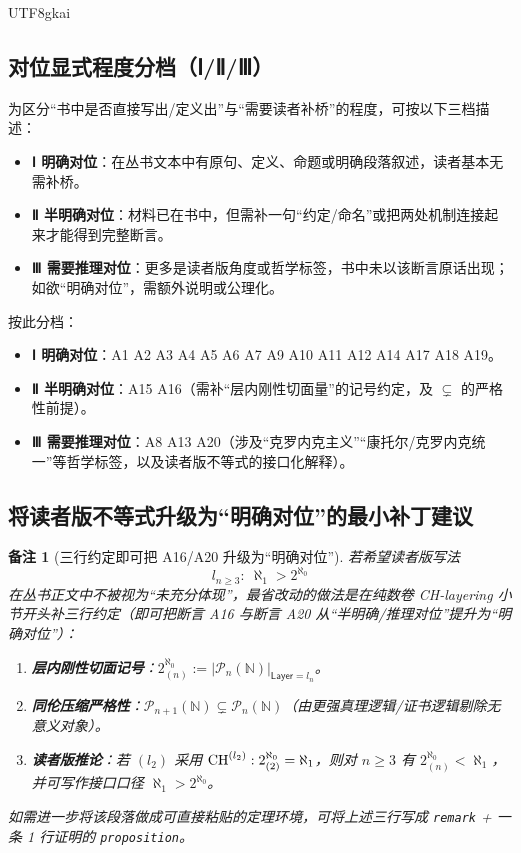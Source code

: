 \documentclass[12pt]{article}
\newtheorem{remark}{备注}[section]
\begin{document}
\begin{CJK*}{UTF8}{gkai}
\subsection{对位显式程度分档（Ⅰ/Ⅱ/Ⅲ）}

为区分“书中是否直接写出/定义出”与“需要读者补桥”的程度，可按以下三档描述：
\begin{itemize}
  \item \textbf{Ⅰ 明确对位}：在丛书文本中有原句、定义、命题或明确段落叙述，读者基本无需补桥。
  \item \textbf{Ⅱ 半明确对位}：材料已在书中，但需补一句“约定/命名”或把两处机制连接起来才能得到完整断言。
  \item \textbf{Ⅲ 需要推理对位}：更多是读者版角度或哲学标签，书中未以该断言原话出现；如欲“明确对位”，需额外说明或公理化。
\end{itemize}

按此分档：
\begin{itemize}
  \item \textbf{Ⅰ 明确对位}：A1 A2 A3 A4 A5 A6 A7 A9 A10 A11 A12 A14 A17 A18 A19。
  \item \textbf{Ⅱ 半明确对位}：A15 A16（需补“层内刚性切面量”的记号约定，及 $\subsetneq$ 的严格性前提）。
  \item \textbf{Ⅲ 需要推理对位}：A8 A13 A20（涉及“克罗内克主义”“康托尔/克罗内克统一”等哲学标签，以及读者版不等式的接口化解释）。
\end{itemize}

\subsection{将读者版不等式升级为“明确对位”的最小补丁建议}

\begin{remark}[三行约定即可把 A16/A20 升级为“明确对位”]
若希望读者版写法
\[
  l_{n\ge3}:\ \aleph_1>2^{\aleph_0}
\]
在丛书正文中不被视为“未充分体现”，最省改动的做法是在纯数卷 CH-layering 小节开头补三行约定（即可把断言 A16 与断言 A20 从“半明确/推理对位”提升为“明确对位”）：
\begin{enumerate}
  \item \textbf{层内刚性切面记号}：$2^{\aleph_0}_{(n)}:=|\mathcal P_n(\mathbb N)|_{\mathsf{Layer}=l_n}$。
  \item \textbf{同伦压缩严格性}：$\mathcal P_{n+1}(\mathbb N)\subsetneq \mathcal P_n(\mathbb N)$（由更强真理逻辑/证书逻辑剔除无意义对象）。
  \item \textbf{读者版推论}：若 $(l_2)$ 采用 $\mathrm{CH}^{(l_2)}:2^{\aleph_0}_{(2)}=\aleph_1$，则对 $n\ge3$ 有 $2^{\aleph_0}_{(n)}
    <\aleph_1$，并可写作接口口径 $\aleph_1>2^{\aleph_0}$。
\end{enumerate}
如需进一步将该段落做成可直接粘贴的定理环境，可将上述三行写成 \texttt{remark} + 一条 1 行证明的 \texttt{proposition}。
\end{remark}


\end{CJK*}
\end{document}
